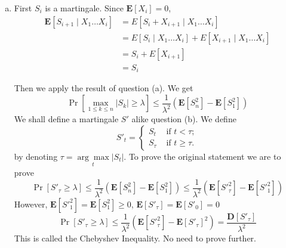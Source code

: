 \documentclass{article}
\theoremstyle{definition}
\begin{document}
\begin{enumerate}[(a)]
		\item First $S_i$ is a martingale. Since $\mathbf E[X_i]=0$, 
		\begin{equation}
			\begin{aligned}
				\mathbf E[S_{i+1}\mid X_1\dots X_i] & = E[S_i+X_{i+1} \mid X_1\dots X_i] \\
				& = E[S_i \mid X_1\dots X_i] + E[X_{i+1} \mid X_1\dots X_i] \\ 
				& = S_i + E[X_{i+1}] \\
				& = S_i
			\end{aligned}
		\end{equation}
		
		Then we apply the result of question (a). We get
		\begin{equation}
			\Pr[\max_{1\le k\le n} | S_k| \ge \lambda] \le \frac{1}{\lambda^2} (\mathbf E[S_n^2] - \mathbf E[S_1^2])
		\end{equation}
		We shall define a martingale $S'$ alike question (b). We define 
		\begin{equation}
			    S'_t = 
			\begin{cases}
				S_t & \mbox{ if }t<\tau;\\
				S_\tau & \mbox{ if }t\ge \tau.
			\end{cases}
		\end{equation} 
		by denoting $\tau = \underset{t}{\arg \max} |S_t|$. To prove the original statement we are to prove 
		\begin{equation}
			\Pr[{S'}_\tau \ge \lambda] \le \frac{1}{\lambda^2} (\mathbf E[S_n^2] - \mathbf E[S_1^2]) \le \frac{1}{\lambda^2} (\mathbf E[{S'}_\tau^2] - \mathbf E[{S'}_1^2])
		\end{equation}
		However, $\mathbf E[{S'}_1^2] = \mathbf E[S_1^2] \geq 0$, $\mathbf E[{S'}_\tau] = \mathbf E[{S'}_0] = 0$
		\begin{equation}
			\Pr[{S'}_\tau \ge \lambda] \le \frac{1}{\lambda^2} (\mathbf E[{S'}_\tau^2] - \mathbf E[{S'}_\tau]^2) = \frac{\mathbf D[{S'}_\tau]}{\lambda^2}
		\end{equation}
		This is called the Chebyshev Inequality. No need to prove further.
	\end{enumerate}
\end{document}
